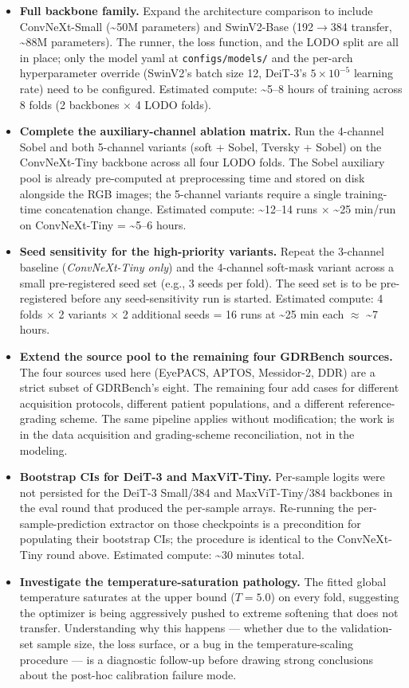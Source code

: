 \documentclass[11pt]{article}
\begin{document}
\begin{itemize}[leftmargin=*, topsep=0pt]
  \item \textbf{Full backbone family.} Expand the architecture comparison to include ConvNeXt-Small (\textasciitilde{}50M parameters) and SwinV2-Base (192$\to$384 transfer, \textasciitilde{}88M parameters). The runner, the loss function, and the LODO split are all in place; only the model yaml at \texttt{configs/models/} and the per-arch hyperparameter override (SwinV2's batch size 12, DeiT-3's $5 \times 10^{-5}$ learning rate) need to be configured. Estimated compute: \textasciitilde{}5--8 hours of training across 8 folds (2 backbones $\times$ 4 LODO folds).
  \item \textbf{Complete the auxiliary-channel ablation matrix.} Run the 4-channel Sobel and both 5-channel variants (soft + Sobel, Tversky + Sobel) on the ConvNeXt-Tiny backbone across all four LODO folds. The Sobel auxiliary pool is already pre-computed at preprocessing time and stored on disk alongside the RGB images; the 5-channel variants require a single training-time concatenation change. Estimated compute: \textasciitilde{}12--14 runs $\times$ \textasciitilde{}25 min/run on ConvNeXt-Tiny = \textasciitilde{}5--6 hours.
  \item \textbf{Seed sensitivity for the high-priority variants.} Repeat the 3-channel baseline (\textit{ConvNeXt-Tiny only}) and the 4-channel soft-mask variant across a small pre-registered seed set (e.g., 3 seeds per fold). The seed set is to be pre-registered before any seed-sensitivity run is started. Estimated compute: 4 folds $\times$ 2 variants $\times$ 2 additional seeds = 16 runs at \textasciitilde{}25 min each $\approx$ \textasciitilde{}7 hours.
  \item \textbf{Extend the source pool to the remaining four GDRBench sources.} The four sources used here (EyePACS, APTOS, Messidor-2, DDR) are a strict subset of GDRBench's eight. The remaining four add cases for different acquisition protocols, different patient populations, and a different reference-grading scheme. The same pipeline applies without modification; the work is in the data acquisition and grading-scheme reconciliation, not in the modeling.
  \item \textbf{Bootstrap CIs for DeiT-3 and MaxViT-Tiny.} Per-sample logits were not persisted for the DeiT-3 Small/384 and MaxViT-Tiny/384 backbones in the eval round that produced the per-sample arrays. Re-running the per-sample-prediction extractor on those checkpoints is a precondition for populating their bootstrap CIs; the procedure is identical to the ConvNeXt-Tiny round above. Estimated compute: \textasciitilde{}30 minutes total.
  \item \textbf{Investigate the temperature-saturation pathology.} The fitted global temperature saturates at the upper bound ($T = 5.0$) on every fold, suggesting the optimizer is being aggressively pushed to extreme softening that does not transfer. Understanding why this happens --- whether due to the validation-set sample size, the loss surface, or a bug in the temperature-scaling procedure --- is a diagnostic follow-up before drawing strong conclusions about the post-hoc calibration failure mode.
\end{itemize}
\end{document}

